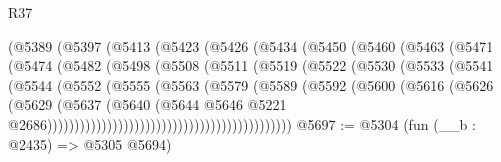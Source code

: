 \begin{lexlean}{R37}
\begin{coremodule}
                          (@5389
                            (@5397
                              (@5413
                                (@5423
                                  (@5426
                                    (@5434
                                      (@5450
                                        (@5460
                                          (@5463
                                            (@5471
                                              (@5474
                                                (@5482
                                                  (@5498
                                                    (@5508
                                                      (@5511
                                                        (@5519
                                                          (@5522
                                                            (@5530
                                                              (@5533
                                                                (@5541
                                                                  (@5544
                                                                    (@5552
                                                                      (@5555
                                                                        (@5563
                                                                          (@5579
                                                                            (@5589
                                                                              (@5592
                                                                                (@5600
                                                                                  (@5616
                                                                                    (@5626
                                                                                      (@5629
                                                                                        (@5637
                                                                                          (@5640
                                                                                            (@5644
                                                                                              @5646
                                                                                              @5221
                                                                                              @2686)))))))))))))))))))))))))))))))))))))))))))))
@5697 := @5304 (fun (__b : @2435) => @5305 @5694)

\end{coremodule}
\end{lexlean}
